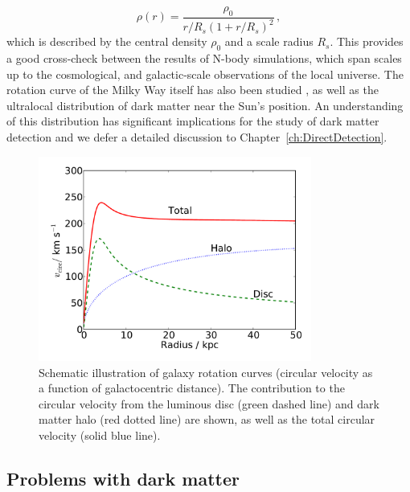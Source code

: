 \begin{equation}
\label{eq:intro:NFW}
\rho(r) = \frac{\rho_0}{r/R_s(1 + r/R_s)^2}\,,
\end{equation}
which is described by the central density $\rho_0$ and a scale radius $R_s$. This provides a good cross-check between the results of N-body simulations, which span scales up to the cosmological, and galactic-scale observations of the local universe. The rotation curve of the Milky Way itself has also been studied , as well as the ultralocal distribution of dark matter near the Sun's position. An understanding of this distribution has significant implications for the study of dark matter detection and we defer a detailed discussion to Chapter~\ref{ch:DirectDetection}.

\begin{figure}[h]
  \label{fig:intro:RotationCurves}
  \centering
  \includegraphics[width=0.8\textwidth]{RotationCurve.pdf}
  \caption[Schematic illustration of galaxy rotation curves]{Schematic illustration of galaxy rotation curves (circular velocity as a function of galactocentric distance). The contribution to the circular velocity from the luminous disc (green dashed line) and dark matter halo (red dotted line) are shown, as well as the total circular velocity (solid blue line). }
\end{figure}




\subsection{Problems with dark matter}

